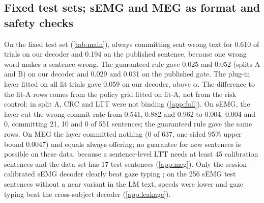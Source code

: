 \subsection{Fixed test sets; sEMG and MEG as format and safety checks}
\label{sec:res-main}
On the fixed test set (\cref{tab:main}), always committing sent wrong text for 0.610 of trials on our decoder and 0.194 on the published sentence, because one wrong word makes a sentence wrong. The guaranteed rule gave 0.025 and 0.052 (splits A and B) on our decoder and 0.029 and 0.031 on the published gate. The plug-in layer fitted on all fit trials gave 0.059  on our decoder, above $\alpha$. The difference to the fit-A rows comes from the policy grid fitted on fit-A, not from the risk control: in split A, CRC and LTT were not binding (\cref{app:full}). On sEMG, the layer cut the wrong-commit rate from 0.541, 0.882 and 0.962 to 0.004, 0.004 and 0, committing 21, 10 and 0 of 551 sentences; the guaranteed rule gave the same rows. On MEG the layer committed nothing (0 of 637, one-sided 95\% upper bound 0.0047) and equals always offering; no guarantee for new sentences is possible on these data, because a sentence-level LTT needs at least 45 calibration sentences and the data set has 17 test sentences (\cref{app:meg}). Only the session-calibrated sEMG decoder clearly beat gaze typing ; on the 256 sEMG test sentences without a near variant in the LM text, speeds were lower and gaze typing beat the cross-subject decoder (\cref{app:leakage}).

